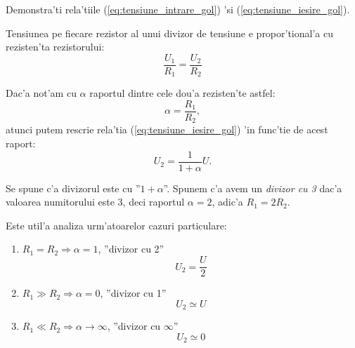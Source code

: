 \begin{exercise}%
Demonstra'ti rela'tiile (\ref{eq:tensiune_intrare_gol}) 'si (\ref{eq:tensiune_iesire_gol}).
\end{exercise}

\begin{retine}
  \label{retine1}
  \index{}
	Tensiunea pe fiecare rezistor al unui divizor de tensiune e propor'tional'a cu rezisten'ta rezistorului:
  \small
  \begin{equation*}
    \frac{U_1}{R_1} = \frac{U_2}{R_2}
  \end{equation*}
\end{retine}

Dac'a not'am cu $\alpha$ raportul dintre cele dou'a rezisten'te astfel:
\begin{equation}
\alpha = \frac{R_1}{R_2},
\end{equation}
atunci putem rescrie rela'tia (\ref{eq:tensiune_iesire_gol}) 'in func'tie de acest raport:
\begin{equation}
U_2 = \frac{1}{1+\alpha}U.
\end{equation}

Se spune c'a divizorul este cu ''$1+\alpha$''. Spunem c'a avem un \textit{divizor cu 3} dac'a valoarea numitorului este 3, deci raportul $\alpha = 2$, adic'a $R_1=2R_2$.

\begin{retine}
  \label{retine2}
  \index{}
	Este util'a analiza urm'atoarelor cazuri particulare:
\begin{enumerate}
\item $R_1 = R_2 \Rightarrow \alpha = 1$, ''divizor cu 2''
\begin{equation*}
U_2 = \frac{U}{2}
\end{equation*}
\item $R_1 \gg R_2 \Rightarrow \alpha = 0$, ''divizor cu 1''
\begin{equation*}
U_2 \simeq U
\end{equation*}
\item $R_1 \ll R_2 \Rightarrow \alpha\rightarrow\infty$, ''divizor cu $\infty$''
\begin{equation*}
U_2 \simeq 0
\end{equation*}
\end{enumerate}
\end{retine}


